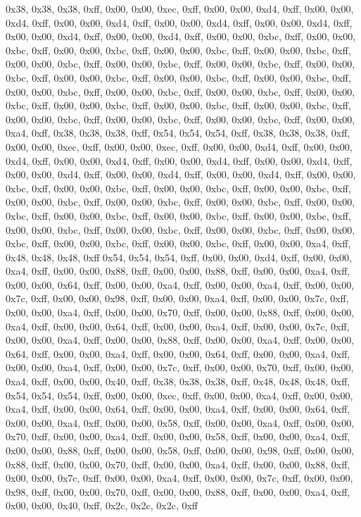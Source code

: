0x38, 0x38, 0x38, 0xff, 0x00, 0x00, 0xec, 0xff, 0x00, 0x00, 0xd4, 0xff, 0x00, 0x00, 0xd4, 0xff, 0x00, 0x00, 0xd4, 0xff, 0x00, 0x00, 0xd4, 0xff, 0x00, 0x00, 0xd4, 0xff, 0x00, 0x00, 0xd4, 0xff, 0x00, 0x00, 0xd4, 0xff, 0x00, 0x00, 0xbc, 0xff, 0x00, 0x00, 0xbc, 0xff, 0x00, 0x00, 0xbc, 0xff, 0x00, 0x00, 0xbc, 0xff, 0x00, 0x00, 0xbc, 0xff, 0x00, 0x00, 0xbc, 0xff, 0x00, 0x00, 0xbc, 0xff, 0x00, 0x00, 0xbc, 0xff, 0x00, 0x00, 0xbc, 0xff, 0x00, 0x00, 0xbc, 0xff, 0x00, 0x00, 0xbc, 0xff, 0x00, 0x00, 0xbc, 0xff, 0x00, 0x00, 0xbc, 0xff, 0x00, 0x00, 0xbc, 0xff, 0x00, 0x00, 0xbc, 0xff, 0x00, 0x00, 0xbc, 0xff, 0x00, 0x00, 0xbc, 0xff, 0x00, 0x00, 0xbc, 0xff, 0x00, 0x00, 0xbc, 0xff, 0x00, 0x00, 0xbc, 0xff, 0x00, 0x00, 0xbc, 0xff, 0x00, 0x00, 0xbc, 0xff, 0x00, 0x00, 0xa4, 0xff, 0x38, 0x38, 0x38, 0xff, 0x54, 0x54, 0x54, 0xff, 0x38, 0x38, 0x38, 0xff, 0x00, 0x00, 0xec, 0xff, 0x00, 0x00, 0xec, 0xff, 0x00, 0x00, 0xd4, 0xff, 0x00, 0x00, 0xd4, 0xff, 0x00, 0x00, 0xd4, 0xff, 0x00, 0x00, 0xd4, 0xff, 0x00, 0x00, 0xd4, 0xff, 0x00, 0x00, 0xd4, 0xff, 0x00, 0x00, 0xd4, 0xff, 0x00, 0x00, 0xd4, 0xff, 0x00, 0x00, 0xbc, 0xff, 0x00, 0x00, 0xbc, 0xff, 0x00, 0x00, 0xbc, 0xff, 0x00, 0x00, 0xbc, 0xff, 0x00, 0x00, 0xbc, 0xff, 0x00, 0x00, 0xbc, 0xff, 0x00, 0x00, 0xbc, 0xff, 0x00, 0x00, 0xbc, 0xff, 0x00, 0x00, 0xbc, 0xff, 0x00, 0x00, 0xbc, 0xff, 0x00, 0x00, 0xbc, 0xff, 0x00, 0x00, 0xbc, 0xff, 0x00, 0x00, 0xbc, 0xff, 0x00, 0x00, 0xbc, 0xff, 0x00, 0x00, 0xbc, 0xff, 0x00, 0x00, 0xbc, 0xff, 0x00, 0x00, 0xbc, 0xff, 0x00, 0x00, 0xa4, 0xff, 0x48, 0x48, 0x48, 0xff
0x54, 0x54, 0x54, 0xff, 0x00, 0x00, 0xd4, 0xff, 0x00, 0x00, 0xa4, 0xff, 0x00, 0x00, 0x88, 0xff, 0x00, 0x00, 0x88, 0xff, 0x00, 0x00, 0xa4, 0xff, 0x00, 0x00, 0x64, 0xff, 0x00, 0x00, 0xa4, 0xff, 0x00, 0x00, 0xa4, 0xff, 0x00, 0x00, 0x7c, 0xff, 0x00, 0x00, 0x98, 0xff, 0x00, 0x00, 0xa4, 0xff, 0x00, 0x00, 0x7c, 0xff, 0x00, 0x00, 0xa4, 0xff, 0x00, 0x00, 0x70, 0xff, 0x00, 0x00, 0x88, 0xff, 0x00, 0x00, 0xa4, 0xff, 0x00, 0x00, 0x64, 0xff, 0x00, 0x00, 0xa4, 0xff, 0x00, 0x00, 0x7c, 0xff, 0x00, 0x00, 0xa4, 0xff, 0x00, 0x00, 0x88, 0xff, 0x00, 0x00, 0xa4, 0xff, 0x00, 0x00, 0x64, 0xff, 0x00, 0x00, 0xa4, 0xff, 0x00, 0x00, 0x64, 0xff, 0x00, 0x00, 0xa4, 0xff, 0x00, 0x00, 0xa4, 0xff, 0x00, 0x00, 0x7c, 0xff, 0x00, 0x00, 0x70, 0xff, 0x00, 0x00, 0xa4, 0xff, 0x00, 0x00, 0x40, 0xff, 0x38, 0x38, 0x38, 0xff, 0x48, 0x48, 0x48, 0xff, 0x54, 0x54, 0x54, 0xff, 0x00, 0x00, 0xec, 0xff, 0x00, 0x00, 0xa4, 0xff, 0x00, 0x00, 0xa4, 0xff, 0x00, 0x00, 0x64, 0xff, 0x00, 0x00, 0xa4, 0xff, 0x00, 0x00, 0x64, 0xff, 0x00, 0x00, 0xa4, 0xff, 0x00, 0x00, 0x58, 0xff, 0x00, 0x00, 0xa4, 0xff, 0x00, 0x00, 0x70, 0xff, 0x00, 0x00, 0xa4, 0xff, 0x00, 0x00, 0x58, 0xff, 0x00, 0x00, 0xa4, 0xff, 0x00, 0x00, 0x88, 0xff, 0x00, 0x00, 0x58, 0xff, 0x00, 0x00, 0x98, 0xff, 0x00, 0x00, 0x88, 0xff, 0x00, 0x00, 0x70, 0xff, 0x00, 0x00, 0xa4, 0xff, 0x00, 0x00, 0x88, 0xff, 0x00, 0x00, 0x7c, 0xff, 0x00, 0x00, 0xa4, 0xff, 0x00, 0x00, 0x7c, 0xff, 0x00, 0x00, 0x98, 0xff, 0x00, 0x00, 0x70, 0xff, 0x00, 0x00, 0x88, 0xff, 0x00, 0x00, 0xa4, 0xff, 0x00, 0x00, 0x40, 0xff, 0x2c, 0x2c, 0x2c, 0xff
